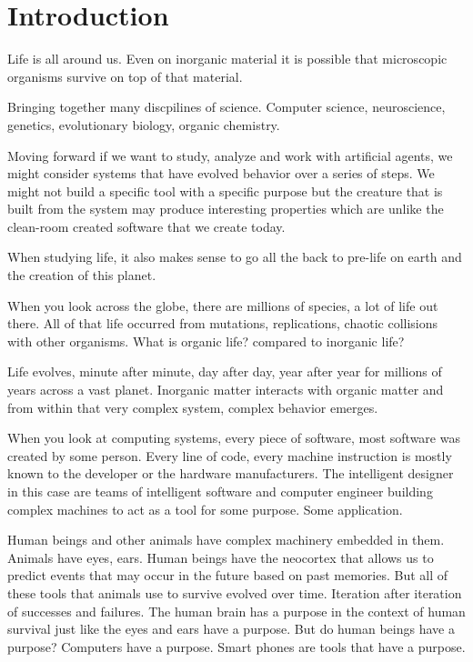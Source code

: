 
\section{Introduction}

Life is all around us.  Even on inorganic material it is possible that
microscopic organisms survive on top of that material.

Bringing together many discpilines of science.  Computer science, neuroscience,
genetics, evolutionary biology, organic chemistry.

Moving forward if we want to study, analyze and work with artificial agents, we
might consider systems that have evolved behavior over a series of steps.  We
might not build a specific tool with a specific purpose but the creature that is
built from the system may produce interesting properties which are unlike the
clean-room created software that we create today.

When studying life, it also makes sense to go all the back to pre-life on earth
and the creation of this planet.

When you look across the globe, there are millions of species, a lot of life out
there.  All of that life occurred from mutations, replications, chaotic
collisions with other organisms. What is organic life? compared to inorganic
life?

Life evolves, minute after minute, day after day, year after year for millions
of years across a vast planet.  Inorganic matter interacts with organic matter
and from within that very complex system, complex behavior emerges.

When you look at computing systems, every piece of software, most software was
created by some person.  Every line of code, every machine instruction is mostly
known to the developer or the hardware manufacturers.  The intelligent designer
in this case are teams of intelligent software and computer engineer building
complex machines to act as a tool for some purpose.  Some application.

Human beings and other animals have complex machinery embedded in them.  Animals
have eyes, ears. Human beings have the neocortex that allows us to predict
events that may occur in the future based on past memories.  But all of these
tools that animals use to survive evolved over time.  Iteration after iteration
of successes and failures.  The human brain has a purpose in the context of
human survival just like the eyes and ears have a purpose.  But do human beings
have a purpose?  Computers have a purpose.  Smart phones are tools that have a
purpose.


